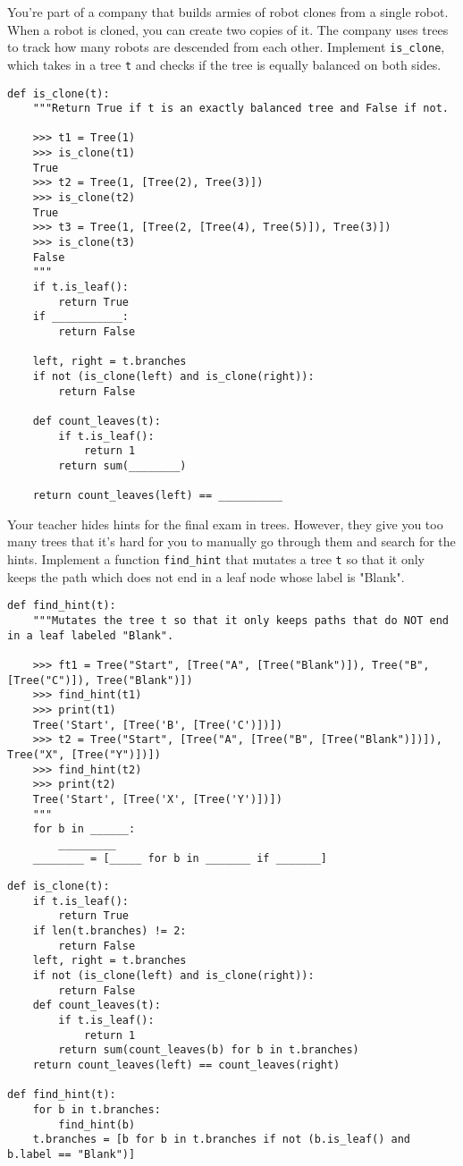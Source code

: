 \begin{blocksection}
\question You're part of a company that builds armies of robot clones from a single robot. When a robot is cloned, you can create two copies of it. The company uses trees to track how many robots are descended from each other.
Implement \lstinline$is_clone$, which takes in a tree \lstinline$t$ and checks if the tree is equally balanced on both sides.

\begin{lstlisting}
def is_clone(t):
    """Return True if t is an exactly balanced tree and False if not.

    >>> t1 = Tree(1)
    >>> is_clone(t1)
    True
    >>> t2 = Tree(1, [Tree(2), Tree(3)])
    >>> is_clone(t2)
    True
    >>> t3 = Tree(1, [Tree(2, [Tree(4), Tree(5)]), Tree(3)])
    >>> is_clone(t3)
    False
    """
	if t.is_leaf():
		return True
	if ___________:
		return False
	
	left, right = t.branches
	if not (is_clone(left) and is_clone(right)):
		return False
	
	def count_leaves(t):
		if t.is_leaf():
			return 1
		return sum(________)
	
	return count_leaves(left) == __________
\end{lstlisting}

\question Your teacher hides hints for the final exam in trees. However, they give you too many trees that it's hard for you to manually go through them and search for the hints. Implement a function \lstinline$find_hint$ that mutates a tree \lstinline$t$ so that it only keeps the path which does not end in a leaf node whose label is "Blank".
\begin{lstlisting}
def find_hint(t):
    """Mutates the tree t so that it only keeps paths that do NOT end in a leaf labeled "Blank".

    >>> ft1 = Tree("Start", [Tree("A", [Tree("Blank")]), Tree("B", [Tree("C")]), Tree("Blank")])
    >>> find_hint(t1)
    >>> print(t1)
    Tree('Start', [Tree('B', [Tree('C')])])
    >>> t2 = Tree("Start", [Tree("A", [Tree("B", [Tree("Blank")])]), Tree("X", [Tree("Y")])])
    >>> find_hint(t2)
    >>> print(t2)
    Tree('Start', [Tree('X', [Tree('Y')])])
    """
	for b in ______:
		_________
	________ = [_____ for b in _______ if _______]
\end{lstlisting}

\begin{solution}[0.7in]
\begin{lstlisting}
def is_clone(t):
    if t.is_leaf():
        return True
    if len(t.branches) != 2:
        return False
    left, right = t.branches
    if not (is_clone(left) and is_clone(right)):
        return False
    def count_leaves(t):
        if t.is_leaf():
            return 1
        return sum(count_leaves(b) for b in t.branches)
    return count_leaves(left) == count_leaves(right)

def find_hint(t):
    for b in t.branches:
        find_hint(b)
    t.branches = [b for b in t.branches if not (b.is_leaf() and b.label == "Blank")]
\end{lstlisting}
\end{solution}
\end{blocksection}